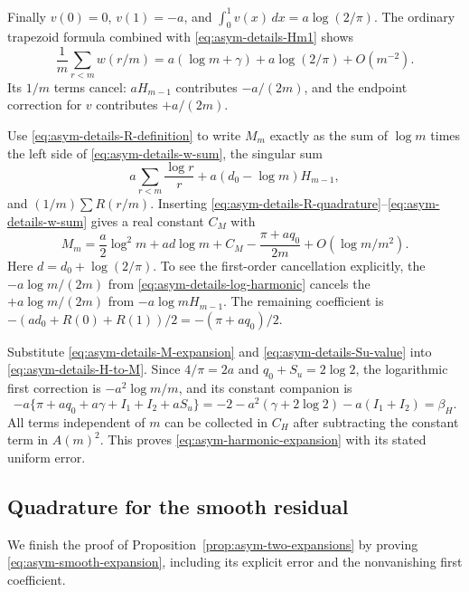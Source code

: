 Finally $v(0)=0$, $v(1)=-a$, and
$\int_0^1v(x)\,dx=a\log(2/\pi)$.  The ordinary trapezoid
formula combined with \eqref{eq:asym-details-Hm1} shows
\begin{equation}\label{eq:asym-details-w-sum}
 \frac1m\sum_{r<m}w(r/m)
       =a(\log m+\gamma)+a\log(2/\pi)+O(m^{-2}).
\end{equation}
Its $1/m$ terms cancel: $aH_{m-1}$ contributes $-a/(2m)$,
and the endpoint correction for $v$ contributes $+a/(2m)$.

Use \eqref{eq:asym-details-R-definition} to write $M_m$ exactly
as the sum of $\log m$ times the left side of
\eqref{eq:asym-details-w-sum}, the singular sum
\[
 a\sum_{r<m}\frac{\log r}{r}+a(d_0-\log m)H_{m-1},
\]
and $(1/m)\sum R(r/m)$.  Inserting
\eqref{eq:asym-details-R-quadrature}--\eqref{eq:asym-details-w-sum}
gives a real constant $C_M$ with
\begin{equation}\label{eq:asym-details-M-expansion}
 M_m=\frac a2\log^2m+ad\log m+C_M
       -\frac{\pi+aq_0}{2m}+O(\log m/m^2).
\end{equation}
Here $d=d_0+\log(2/\pi)$.  To see the first-order cancellation
explicitly, the $-a\log m/(2m)$ from
\eqref{eq:asym-details-log-harmonic} cancels the
$+a\log m/(2m)$ from $-a\log m H_{m-1}$.
The remaining coefficient is
$-(ad_0+R(0)+R(1))/2=-(\pi+aq_0)/2$.

Substitute \eqref{eq:asym-details-M-expansion} and
\eqref{eq:asym-details-Su-value} into
\eqref{eq:asym-details-H-to-M}.  Since $4/\pi=2a$ and
$q_0+S_u=2\log2$, the logarithmic first correction is
$-a^2\log m/m$, and its constant companion is
\[
 -a\{\pi+aq_0+a\gamma+I_1+I_2+aS_u\}
       =-2-a^2(\gamma+2\log2)-a(I_1+I_2)=\beta_H.
\]
All terms independent of $m$ can be collected in $C_H$ after
subtracting the constant term in $A(m)^2$.  This proves
\eqref{eq:asym-harmonic-expansion} with its stated uniform error.

\subsection{Quadrature for the smooth residual}
\label{sec:asym-details-smooth}

We finish the proof of Proposition~\ref{prop:asym-two-expansions}
by proving \eqref{eq:asym-smooth-expansion}, including its explicit
error and the nonvanishing first coefficient.

